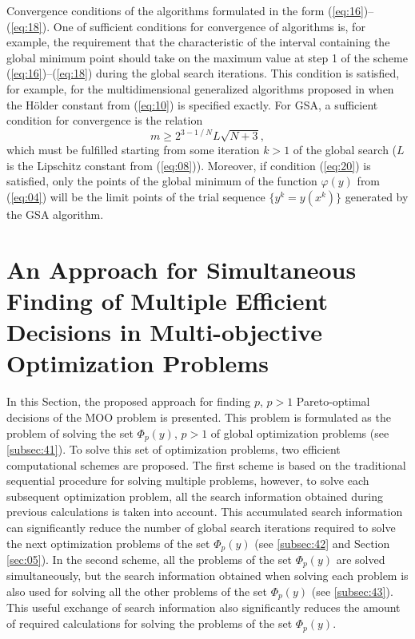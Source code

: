 \documentclass[runningheads]{llncs}
\begin{document}
Convergence conditions of the algorithms formulated in the form (\ref{eq:16})--(\ref{eq:18}). One of sufficient conditions for convergence of algorithms is, for example, the requirement that the characteristic of the interval containing the global minimum point should take on the maximum value at step 1 of the scheme (\ref{eq:16})--(\ref{eq:18}) during the global search iterations. This condition is satisfied, for example, for the multidimensional generalized algorithms proposed in \cite{c22,c23} when the H{\"o}lder constant from (\ref{eq:10}) is specified exactly. For GSA, a sufficient condition for convergence is the relation \cite{c15}
\begin{equation}
\label{eq:20}
m \geq 2^{3-1⁄N} L\sqrt{N+3},
\end{equation}
which must be fulfilled starting from some iteration $k>1$ of the global search ($L$ is the Lipschitz constant from (\ref{eq:08})). Moreover, if condition (\ref{eq:20}) is satisfied, only the points of the global minimum of the function $\varphi(y)$ from (\ref{eq:04}) will be the limit points of the trial sequence $\{y^k=y(x^k)\}$ generated by the GSA algorithm.

\section{An Approach for Simultaneous Finding of Multiple Efficient Decisions in Multi-objective Optimization Problems} \label{sec:04}

In this Section, the proposed approach for finding $p$, $p>1$ Pareto-optimal decisions of the MOO problem is presented. This problem is formulated as the problem of solving the set $\Phi_p (y)$, $p>1$ of global optimization problems (see \ref{subsec:41}). To solve this set of optimization problems, two efficient computational schemes are proposed. The first scheme is based on the traditional sequential procedure for solving multiple problems, however, to solve each subsequent optimization problem, all the search information obtained during previous calculations is taken into account. This accumulated search information can significantly reduce the number of global search iterations required to solve the next optimization problems of the set $\Phi_p (y)$ (see \ref{subsec:42} and Section \ref{sec:05}). In the second scheme, all the problems of the set $\Phi_p (y)$ are solved simultaneously, but the search information obtained when solving each problem is also used for solving all the other problems of the set $\Phi_p (y)$ (see \ref{subsec:43}). This useful exchange of search information also significantly reduces the amount of required calculations for solving the problems of the set $\Phi_p (y)$.
\end{document}
